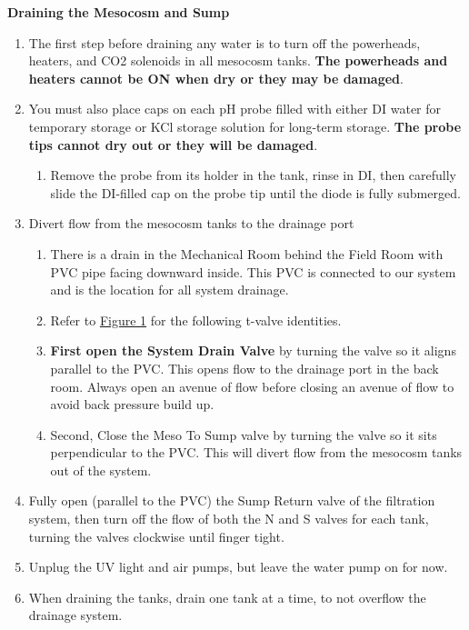 \documentclass[
]{book}
\providecommand{\tightlist}{%
  \setlength{\itemsep}{0pt}\setlength{\parskip}{0pt}}
\begin{document}
\textbf{Draining the Mesocosm and Sump}

\begin{enumerate}
\def\labelenumi{\arabic{enumi}.}
\tightlist
\item
  The first step before draining any water is to turn off the powerheads, heaters, and CO2 solenoids in all mesocosm tanks. \textbf{The powerheads and heaters cannot be ON when dry or they may be damaged}.
\item
  You must also place caps on each pH probe filled with either DI water for temporary storage or KCl storage solution for long-term storage. \textbf{The probe tips cannot dry out or they will be damaged}.

  \begin{enumerate}
  \def\labelenumii{\arabic{enumii}.}
  \tightlist
  \item
    Remove the probe from its holder in the tank, rinse in DI, then carefully slide the DI-filled cap on the probe tip until the diode is fully submerged.
  \end{enumerate}
\item
  Divert flow from the mesocosm tanks to the drainage port

  \begin{enumerate}
  \def\labelenumii{\arabic{enumii}.}
  \tightlist
  \item
    There is a drain in the Mechanical Room behind the Field Room with PVC pipe facing downward inside. This PVC is connected to our system and is the location for all system drainage.
  \item
    Refer to \protect\hyperlink{Figure1}{Figure 1} for the following t-valve identities.
  \item
    \textbf{First open the System Drain Valve} by turning the valve so it aligns parallel to the PVC. This opens flow to the drainage port in the back room. Always open an avenue of flow before closing an avenue of flow to avoid back pressure build up.
  \item
    Second, Close the Meso To Sump valve by turning the valve so it sits perpendicular to the PVC. This will divert flow from the mesocosm tanks out of the system.
  \end{enumerate}
\item
  Fully open (parallel to the PVC) the Sump Return valve of the filtration system, then turn off the flow of both the N and S valves for each tank, turning the valves clockwise until finger tight.
\item
  Unplug the UV light and air pumps, but leave the water pump on for now.
\item
  When draining the tanks, drain one tank at a time, to not overflow the drainage system.


\end{enumerate}
\end{document}
